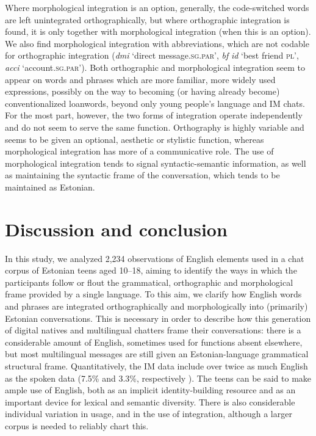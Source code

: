 \documentclass[output=paper]{langscibook}
\begin{document}
Where morphological integration is an option, generally, the code-switched words are left unintegrated orthographically, but where orthographic integration is found, it is only together with morphological integration (when this is an option). We also find morphological integration with abbreviations, which are not codable for orthographic integration (\textit{dmi} ‘direct message.\textsc{sg.par}’, \textit{bf} \textit{id} ‘best friend \textsc{pl}’, \textit{acci} ‘account.\textsc{sg.par}’). Both orthographic and morphological integration seem to appear on words and phrases which are more familiar, more widely used expressions, possibly on the way to becoming (or having already become) conventionalized loanwords, beyond only young people’s language and IM chats. For the most part, however, the two forms of integration operate independently and do not seem to serve the same function. Orthography is highly variable and seems to be given an optional, aesthetic or stylistic function, whereas morphological integration has more of a communicative role. The use of morphological integration tends to signal syntactic-semantic information, as well as maintaining the syntactic frame of the conversation, which tends to be maintained as Estonian.

\section{Discussion and conclusion}\label{sec:vihmanetal:5}

In this study, we analyzed 2,234 observations of English elements used in a chat corpus of Estonian teens aged 10--18, aiming to identify the ways in which the participants follow or flout the grammatical, orthographic and morphological frame provided by a single language. To this aim, we clarify how English words and phrases are integrated orthographically and morphologically into (primarily) Estonian conversations. This is necessary in order to describe how this generation of digital natives and multilingual chatters frame their conversations: there is a considerable amount of English, sometimes used for functions absent elsewhere, but most multilingual messages are still given an Estonian-language grammatical structural frame. Quantitatively, the IM data include over twice as much English as the spoken data (7.5\% and 3.3\%, respectively \citealt{VihmanEtAl2022}). The teens can be said to make ample use of English, both as an implicit identity-building resource and as an important device for lexical and semantic diversity. There is also considerable individual variation in usage, and in the use of integration, although a larger corpus is needed to reliably chart this.
\end{document}
